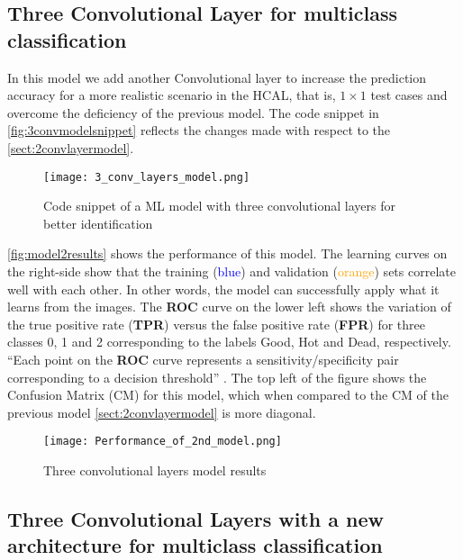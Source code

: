 	
\subsection{Three Convolutional Layer for multiclass classification}
	
In this model we add another Convolutional layer to increase the prediction accuracy for a more realistic scenario in the HCAL, that is, $1\times1$ test cases and overcome the deficiency of the previous model. The code snippet in \autoref{fig:3convmodelsnippet} reflects the changes made with respect to the \autoref{sect:2convlayermodel}.



\begin{figure}
\texttt{[image: 3\_conv\_layers\_model.png]}
\caption{Code snippet of a ML model with three convolutional layers for better identification\label{fig:3convmodelsnippet}}
\end{figure}
\vspace{1cm}

\autoref{fig:model2results} shows the performance of this model. The learning curves on the right-side show that the training (\textcolor{blue}{blue}) and validation (\textcolor{orange}{orange}) sets correlate well with each other. In other words, the model can successfully apply what it learns from the images. The \textbf{ROC} curve on the lower left 
shows the variation of the true positive rate (\textbf{TPR}) versus the false positive rate (\textbf{FPR}) for three classes 0, 1 and 2 corresponding to the labels Good, Hot and Dead, respectively.
 “Each point on the \textbf{ROC} curve represents a sensitivity/specificity pair corresponding to a decision threshold” \cite{Med18}.
  The top left of the figure shows the Confusion Matrix (CM) for this model, which when compared to the CM of the previous model \autoref{sect:2convlayermodel} is more diagonal. 
  
\vspace{1cm}
  
\begin{figure}
\texttt{[image: Performance\_of\_2nd\_model.png]}
\caption{Three convolutional layers model results\label{fig:model2results}}
\end{figure}

\subsection{Three Convolutional Layers with a new architecture for multiclass classification}

